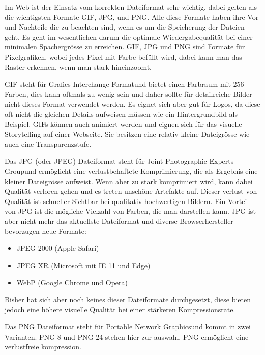 
Im Web ist der Einsatz vom korrekten Dateiformat sehr wichtig, dabei gelten als die wichtigsten Formate GIF, JPG, und PNG.
Alle diese Formate haben ihre Vor- und Nachteile die zu beachten sind, wenn es um die Speicherung der Dateien geht.
Es geht im wesentlichen darum die optimale Wiedergabequalität bei einer minimalen Spachergrösse zu erreichen.
GIF, JPG und PNG sind Formate für Pixelgrafiken, wobei jedes Pixel mit Farbe befüllt wird, dabei kann man das Raster
erkennen, wenn man stark hineinzoomt.

GIF steht für \dq Grafics Interchange Format\dq und bietet einen Farbraum mit 256 Farben, dies kann oftmals zu wenig
sein und daher sollte für detailreiche Bilder nicht dieses Format verwendet werden.
Es eignet sich aber gut für Logos, da diese oft nicht die gleichen Details aufweisen müssen wie ein Hintergrundbild als Beispiel.
GIFs können auch animiert werden und eignen sich für das visuelle Storytelling auf einer Webseite.
Sie besitzen eine relativ kleine Dateigrösse wie auch eine Transparenzstufe.

Das JPG (oder JPEG) Dateiformat steht für \dq Joint Photographic Experts Group\dq und ermöglicht eine verlustbehaftete
Komprimierung, die als Ergebnis eine kleiner Dateigrösse aufweist.
Wenn aber zu stark komprimiert wird, kann dabei Qualität verloren gehen und es treten unschöne Artefakte auf.
Dieser verlust von Qualität ist schneller Sichtbar bei qualitativ hochwertigen Bildern.
Ein Vorteil von JPG ist die mögliche Vielzahl von Farben, die man darstellen kann.
JPG ist aber nicht mehr das aktuellste Dateiformat und diverse Browserhersteller bevorzugen neue Formate:
\begin{itemize}
    \item JPEG 2000 (Apple Safari)
    \item JPEG XR (Microsoft mit IE 11 und Edge)
    \item WebP (Google Chrome und Opera)
\end{itemize}
Bisher hat sich aber noch keines dieser Dateiformate durchgesetzt, diese bieten jedoch eine höhere visuelle Qualität bei
einer stärkeren Kompressionsrate.

Das PNG Dateiformat steht für \dq Portable Network Graphics\dq und kommt in zwei Varianten.
PNG-8 und PNG-24 stehen hier zur auswahl.
PNG ermöglicht eine verlustfreie kompression.





